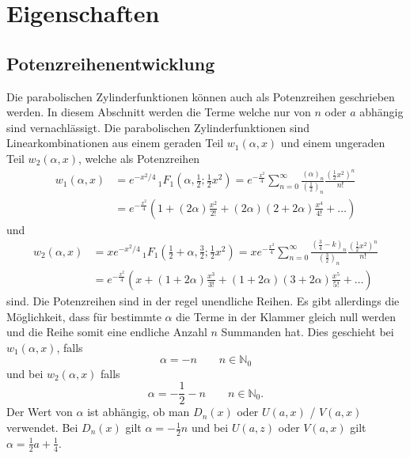 %
%
%
\section{Eigenschaften
\label{parzyl:section:Eigenschaften}}

\subsection{Potenzreihenentwicklung
	\label{parzyl:potenz}}
Die parabolischen Zylinderfunktionen können auch als Potenzreihen geschrieben werden.
In diesem Abschnitt werden die Terme welche nur von $n$ oder $a$ abhängig sind vernachlässigt.
Die parabolischen Zylinderfunktionen sind Linearkombinationen aus einem geraden Teil $w_1(\alpha, x)$ 
und einem ungeraden Teil $w_2(\alpha, x)$, welche als Potenzreihen
\begin{align}
	w_1(\alpha,x)
	&=  
	e^{-x^2/4} \,
	{}_{1} F_{1}
	(
	\alpha, {\textstyle \frac{1}{2}} ; {\textstyle \frac{1}{2}}x^2) 
	= 
	e^{-\frac{x^2}{4}}
	\sum^{\infty}_{n=0}
	\frac{\left ( \alpha \right )_{n}}{\left ( \frac{1}{2}\right )_{n}}
	\frac{\left ( \frac{1}{2} x^2\right )^n}{n!} \\
	&=
	e^{-\frac{x^2}{4}}
	\left ( 
	1 
	+
	\left ( 2\alpha \right )\frac{x^2}{2!}
	+
	\left ( 2\alpha \right )\left ( 2 + 2\alpha \right )\frac{x^4}{4!}  
	+
	\dots
	\right )
\end{align}
und
\begin{align}
	w_2(\alpha,x)
	&=  
	xe^{-x^2/4} \,
	{}_{1} F_{1}
	(
	{\textstyle \frac{1}{2}} 
	+ \alpha, {\textstyle \frac{3}{2}} ; {\textstyle \frac{1}{2}}x^2) 
	= 
	xe^{-\frac{x^2}{4}}
	\sum^{\infty}_{n=0}
	\frac{\left ( \frac{3}{4} - k \right )_{n}}{\left ( \frac{3}{2}\right )_{n}}
	\frac{\left ( \frac{1}{2} x^2\right )^n}{n!} \\
	&=
	e^{-\frac{x^2}{4}}
	\left ( 
	x 
	+
	\left ( 1 + 2\alpha \right )\frac{x^3}{3!}
	+
	\left ( 1 + 2\alpha \right )\left ( 3 + 2\alpha \right )\frac{x^5}{5!}  
	+
	\dots
	\right )
\end{align}
sind.
Die Potenzreihen sind in der regel unendliche Reihen. 
Es gibt allerdings die Möglichkeit, dass für bestimmte $\alpha$ die Terme in der Klammer gleich null werden 
und die Reihe somit eine endliche Anzahl $n$ Summanden hat.
Dies geschieht bei $w_1(\alpha,x)$, falls
\begin{equation}
	\alpha =  -n \qquad n \in \mathbb{N}_0
\end{equation}
und bei $w_2(\alpha,x)$ falls
\begin{equation}
	\alpha = -\frac{1}{2} - n \qquad n \in \mathbb{N}_0.
\end{equation}
Der Wert von $\alpha$ ist abhängig, ob man $D_n(x)$ oder $U(a,x)$ / $V(a,x)$ verwendet.
Bei $D_n(x)$ gilt $\alpha = -{\textstyle \frac{1}{2}} n$ und bei $U(a,z)$ oder $V(a,x)$ gilt 
$\alpha = {\textstyle \frac{1}{2}} a + {\textstyle \frac{1}{4}}$.
